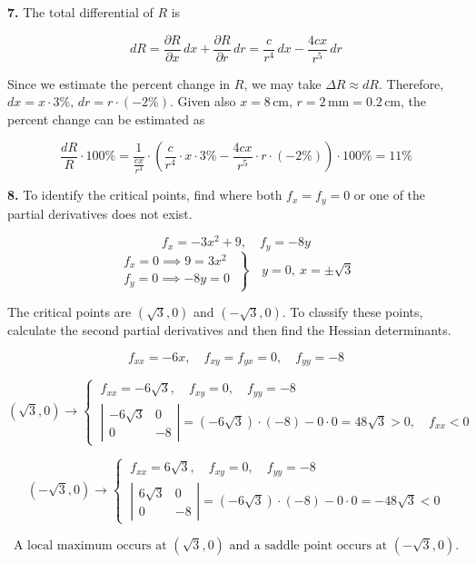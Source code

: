 \documentclass{article}
\begin{document}
\textbf{7.} The total differential of $R$ is

\[dR=\frac{\partial R}{\partial x}\,dx+\frac{\partial R}{\partial r}\,dr=\frac c{r^4}\,dx-\frac{4cx}{r^5}\,dr\]

Since we estimate the percent change in $R$, we may take $\Delta R\approx dR$. Therefore, $dx=x\cdot3\%,\,dr=r\cdot(-2\%)$. Given also $x=8\,\text{cm},\,r=2\, \text{mm}=0.2\,\text{cm}$, the percent change can be estimated as

\[\frac{dR}R\cdot100\%=\frac1{\frac{cx}{r^4}}\cdot\left(\frac c{r^4}\cdot x\cdot3\%-\frac{4cx}{r^5}\cdot r\cdot(-2\%)\right)\cdot100\%=\boxed{11\%}\]

\vspace{1em}

\textbf{8.} To identify the critical points, find where both $f_x=f_y=0$ or one of the partial derivatives does not exist.

\[f_x=-3x^2+9,\quad f_y=-8y\]
\[\left.\begin{array}{c}
f_x=0\implies9=3x^2\\
f_y=0\implies-8y=0 
\end{array}\:\right\}\quad y=0,\:x=\pm\sqrt3\]

The critical points are $\left(\sqrt3,0\right)$ and $\left(-\sqrt3,0\right)$. To classify these points, calculate the second partial derivatives and then find the Hessian determinants.

\[f_{xx}=-6x,\quad f_{xy}=f_{yx}=0,\quad f_{yy}=-8\]

\[\left(\sqrt3,0\right)\rightarrow\left\{\:\begin{array}{l}
f_{xx}=-6\sqrt3,\quad f_{xy}=0,\quad f_{yy}=-8\\[1em]
\left|\begin{array}{cc}
-6\sqrt3 & 0\\
0 & -8
\end{array}\right|=\left(-6\sqrt3\right)\cdot(-8)-0\cdot0=48\sqrt3>0,\quad f_{xx}<0
\end{array}\right.\]

\[\left(-\sqrt3,0\right)\rightarrow\left\{\:\begin{array}{l}
f_{xx}=6\sqrt3,\quad f_{xy}=0,\quad f_{yy}=-8\\[1em]
\left|\begin{array}{cc}
6\sqrt3 & 0\\
0 & -8
\end{array}\right|=\left(-6\sqrt3\right)\cdot(-8)-0\cdot0=-48\sqrt3<0
\end{array}\right.\]

\[\boxed{\text{A local maximum occurs at }\left(\sqrt3,0\right)\text{ and a saddle point occurs at }\left(-\sqrt3,0\right).}\]
\end{document}
